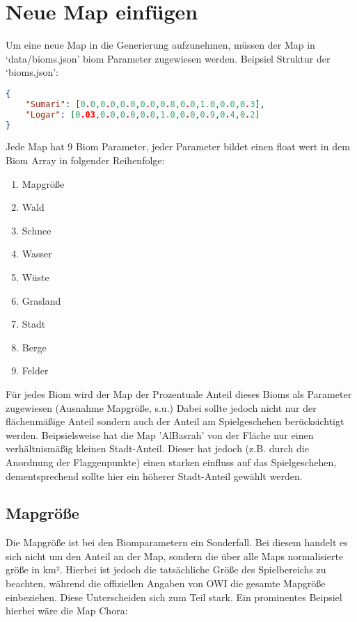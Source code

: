 \section{Neue Map einfügen}
Um eine neue Map in die Generierung aufzunehmen, müssen der Map in `data/bioms.json' biom Parameter zugewiesen werden. \newline
Beipsiel Struktur der `bioms.json': \newline

\begin{lstlisting}[language=json, firstnumber=1]
{
    "Sumari": [0.0,0.0,0.0,0.0,0.8,0.0,1.0,0.0,0.3],
    "Logar": [0.03,0.0,0.0,0.0,1.0,0.0,0.9,0.4,0.2]
}
\end{lstlisting}
Jede Map hat 9 Biom Parameter, jeder Parameter bildet einen float wert in dem Biom Array in folgender Reihenfolge: \newline
\begin{enumerate}
    \item Mapgröße
    \item Wald
    \item Schnee
    \item Wasser
    \item Wüste
    \item Grasland
    \item Stadt
    \item Berge
    \item Felder
\end{enumerate}

Für jedes Biom wird der Map der Prozentuale Anteil dieses Bioms als Parameter zugewiesen (Ausnahme Mapgröße, s.u.)
Dabei sollte jedoch nicht nur der flächenmäßige Anteil sondern auch der Anteil am Spielgeschehen berücksichtigt werden.
Beipsielsweise hat die Map 'AlBasrah' von der Fläche nur einen verhältnismäßig kleinen Stadt-Anteil.
Dieser hat jedoch (z.B. durch die Anordnung der Flaggenpunkte) einen starken einfluss auf das Spielgeschehen,
 dementsprechend sollte hier ein höherer Stadt-Anteil gewählt werden.
\newpage

\subsection{Mapgröße}
Die Mapgröße ist bei den Biomparametern ein Sonderfall.\newline
Bei diesem handelt es sich nicht um den Anteil an der Map, sondern die über alle Maps normalisierte größe in km².\newline
Hierbei ist jedoch die tatsächliche Größe des Spielbereichs zu beachten, 
während die offiziellen Angaben von OWI die gesamte Mapgröße einbeziehen. Diese Unterscheiden sich zum Teil stark.\newline
Ein prominentes Beipsiel hierbei wäre die Map Chora:\newline

